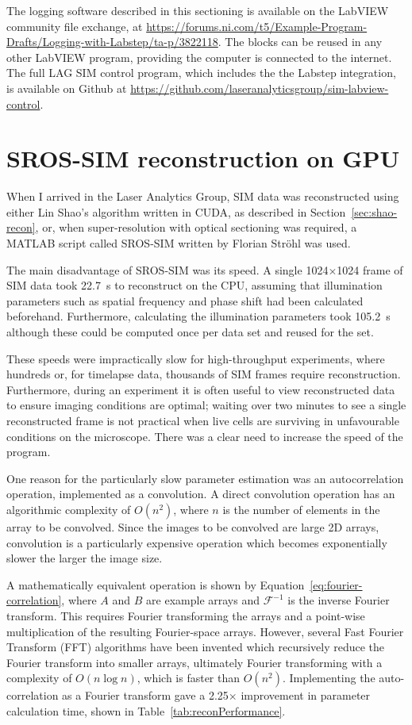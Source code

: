 The logging software described in this sectioning is available on the LabVIEW community file exchange, at \url{https://forums.ni.com/t5/Example-Program-Drafts/Logging-with-Labstep/ta-p/3822118}. 
The blocks can be reused in any other LabVIEW program, providing the computer is connected to the internet. 
The full LAG SIM control program, which includes the the Labstep integration, is available on Github at \url{https://github.com/laseranalyticsgroup/sim-labview-control}. 

\section{SROS-SIM reconstruction on GPU} \label{appx:gpu-srossim}
When I arrived in the Laser Analytics Group, SIM data was reconstructed using either Lin Shao's algorithm written in CUDA, as described in Section~\ref{sec:shao-recon}, or, when super-resolution with optical sectioning was required, a MATLAB script called SROS-SIM written by Florian Str{\"o}hl was used. 

The main disadvantage of SROS-SIM was its speed. 
A single 1024$\times$1024 frame of SIM data took \SI{22.7}{\second} to reconstruct on the CPU, assuming that illumination parameters such as spatial frequency and phase shift had been calculated beforehand. 
Furthermore, calculating the illumination parameters took \SI{105.2}{\second} although these could be computed once per data set and reused for the set. 

These speeds were impractically slow for high-throughput experiments, where hundreds or, for timelapse data, thousands of SIM frames require reconstruction. 
Furthermore, during an experiment it is often useful to view reconstructed data to ensure imaging conditions are optimal; waiting over two minutes to see a single reconstructed frame is not practical when live cells are surviving in unfavourable conditions on the microscope. 
There was a clear need to increase the speed of the program.

One reason for the particularly slow parameter estimation was an autocorrelation operation, implemented as a convolution.
A direct convolution operation has an algorithmic complexity of $O(n^2)$, where $n$ is the number of elements in the array to be convolved. 
Since the images to be convolved are large 2D arrays, convolution is a particularly expensive operation which becomes exponentially slower the larger the image size. 

A mathematically equivalent operation is shown by Equation~\ref{eq:fourier-correlation}, where $A$ and $B$ are example arrays and $\mathcal{F}^{-1}$ is the inverse Fourier transform. 
This requires Fourier transforming the arrays and a point-wise multiplication of the resulting Fourier-space arrays.
However, several Fast Fourier Transform (FFT) algorithms have been invented which recursively reduce the Fourier transform into smaller arrays, ultimately Fourier transforming with a complexity of $O(n\log n)$, which is faster than $O(n^2)$. 
Implementing the auto-correlation as a Fourier transform gave a 2.25$\times$ improvement in parameter calculation time, shown in Table~\ref{tab:reconPerformance}. 


